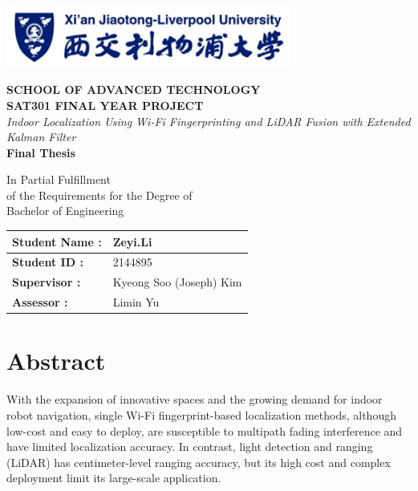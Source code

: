 \documentclass[12pt,a4paper]{article}
\numberwithin{equation}{section}
\begin{document}
  \onehalfspacing %

\begin{titlepage}
  \centering \vspace*{-1cm}
  \includegraphics[width=0.7\textwidth]{images/xjtlu.png}
  \vspace{1cm}

  {\large \textbf{SCHOOL OF ADVANCED TECHNOLOGY}}\\[0.3cm]
  {\large \textbf{SAT301 FINAL YEAR PROJECT}}\\[3cm]
  {\Large \textit{Indoor Localization Using Wi-Fi Fingerprinting and LiDAR Fusion with Extended Kalman Filter}}\\[2cm]
  {\LARGE \textbf{Final Thesis}}\\[4cm]

\begin{center}
  \large
  In Partial Fulfillment\\
  of the Requirements for the Degree of\\
  Bachelor of Engineering
\end{center}

\vfill
\begin{table}[H]
  \centering
  \begin{tabular}{|l|l|}
    \hline
    \textbf{Student Name :} & Zeyi.Li \\ \hline
    \textbf{Student ID :}   & 2144895 \\ \hline
    \textbf{Supervisor :}   & Kyeong Soo (Joseph) Kim \\ \hline
    \textbf{Assessor :}     & Limin Yu\\ \hline
  \end{tabular}
\end{table}
\end{titlepage}

\section*{Abstract}
With the expansion of innovative spaces and the growing demand for indoor robot
navigation, single Wi-Fi fingerprint-based localization methods, although
low-cost and easy to deploy, are susceptible to multipath fading interference
and have limited localization accuracy. In contrast, light detection and ranging
(LiDAR) has centimeter-level ranging accuracy, but its high cost and complex
deployment limit its large-scale application.
\end{document}
